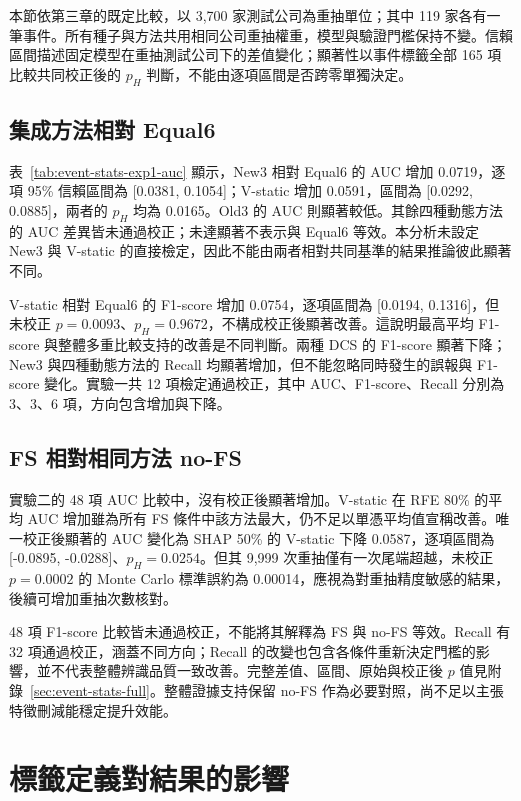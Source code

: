 本節依第三章的既定比較，以 3,700 家測試公司為重抽單位；其中 119 家各有一筆事件。所有種子與方法共用相同公司重抽權重，模型與驗證門檻保持不變。信賴區間描述固定模型在重抽測試公司下的差值變化；顯著性以事件標籤全部 165 項比較共同校正後的 \(p_H\) 判斷，不能由逐項區間是否跨零單獨決定。

\subsection{集成方法相對 Equal6}



表~\ref{tab:event-stats-exp1-auc} 顯示，New3 相對 Equal6 的 AUC 增加 0.0719，逐項 95\% 信賴區間為 [0.0381, 0.1054]；V-static 增加 0.0591，區間為 [0.0292, 0.0885]，兩者的 \(p_H\) 均為 0.0165。Old3 的 AUC 則顯著較低。其餘四種動態方法的 AUC 差異皆未通過校正；未達顯著不表示與 Equal6 等效。本分析未設定 New3 與 V-static 的直接檢定，因此不能由兩者相對共同基準的結果推論彼此顯著不同。

V-static 相對 Equal6 的 F1-score 增加 0.0754，逐項區間為 [0.0194, 0.1316]，但未校正 \(p=0.0093\)、\(p_H=0.9672\)，不構成校正後顯著改善。這說明最高平均 F1-score 與整體多重比較支持的改善是不同判斷。兩種 DCS 的 F1-score 顯著下降；New3 與四種動態方法的 Recall 均顯著增加，但不能忽略同時發生的誤報與 F1-score 變化。實驗一共 12 項檢定通過校正，其中 AUC、F1-score、Recall 分別為 3、3、6 項，方向包含增加與下降。

\subsection{FS 相對相同方法 no-FS}

實驗二的 48 項 AUC 比較中，沒有校正後顯著增加。V-static 在 RFE 80\% 的平均 AUC 增加雖為所有 FS 條件中該方法最大，仍不足以單憑平均值宣稱改善。唯一校正後顯著的 AUC 變化為 SHAP 50\% 的 V-static 下降 0.0587，逐項區間為 [-0.0895, -0.0288]、\(p_H=0.0254\)。但其 9,999 次重抽僅有一次尾端超越，未校正 \(p=0.0002\) 的 Monte Carlo 標準誤約為 0.00014，應視為對重抽精度敏感的結果，後續可增加重抽次數核對。

48 項 F1-score 比較皆未通過校正，不能將其解釋為 FS 與 no-FS 等效。Recall 有 32 項通過校正，涵蓋不同方向；Recall 的改變也包含各條件重新決定門檻的影響，並不代表整體辨識品質一致改善。完整差值、區間、原始與校正後 \(p\) 值見附錄~\ref{sec:event-stats-full}。整體證據支持保留 no-FS 作為必要對照，尚不足以主張特徵刪減能穩定提升效能。

\section{標籤定義對結果的影響}\label{sec:results-label}

